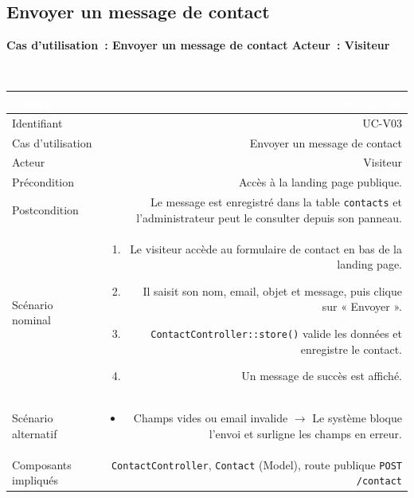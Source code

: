 \documentclass[a4paper,12pt]{article}
\newcommand{\ucheader}[2]{%
  \noindent\colorbox{capblue}{\parbox{\dimexpr\linewidth-2\fboxsep}{%
    \color{white}\bfseries\large Cas d'utilisation~: #1 \hfill \normalsize Acteur~: #2
  }}\\[2pt]
}
\begin{document}
\vspace{1em}

\subsection{Envoyer un message de contact}
\ucheader{Envoyer un message de contact}{Visiteur}

\noindent
\begin{tabular}{|L|R|}
\hline
{}\textcolor{white}{\textbf{Champ}} & \textcolor{white}{\textbf{Description}} \\
\hline
{}Identifiant & UC-V03 \\
\hline
Cas d'utilisation & Envoyer un message de contact \\
\hline
{}Acteur & Visiteur \\
\hline
Précondition & Accès à la landing page publique. \\
\hline
{}Postcondition & Le message est enregistré dans la table \texttt{contacts} et l'administrateur peut le consulter depuis son panneau. \\
\hline
Scénario nominal &
\begin{enumerate}
  \item Le visiteur accède au formulaire de contact en bas de la landing page.
  \item Il saisit son nom, email, objet et message, puis clique sur « Envoyer ».
  \item \texttt{ContactController::store()} valide les données et enregistre le contact.
  \item Un message de succès est affiché.
\end{enumerate} \\
\hline
{}Scénario alternatif &
\begin{itemize}
  \item Champs vides ou email invalide $\rightarrow$ Le système bloque l'envoi et surligne les champs en erreur.
\end{itemize} \\
\hline
Composants impliqués & \texttt{ContactController}, \texttt{Contact} (Model), route publique \texttt{POST /contact} \\
\hline
\end{tabular}

\vspace{1em}
\end{document}
